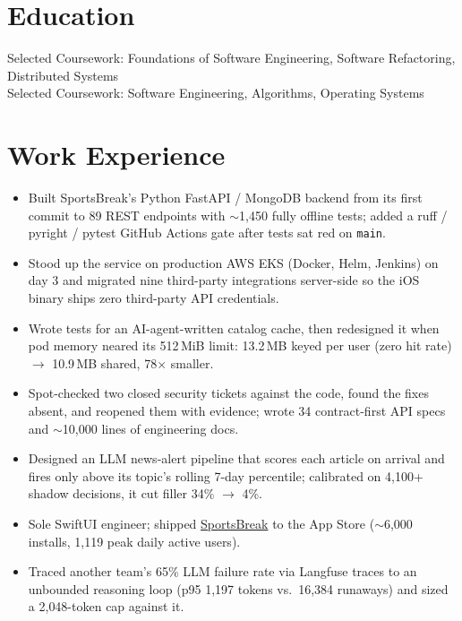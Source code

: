 \documentclass[11pt, letterpaper]{article}
\begin{document}

\section{Education}
Selected Coursework: Foundations of Software Engineering, Software Refactoring, Distributed Systems\\[1pt]
Selected Coursework: Software Engineering, Algorithms, Operating Systems

\section{Work Experience}
\begin{itemize}
  \item Built SportsBreak's Python FastAPI / MongoDB backend from its first commit to 89 REST endpoints with $\sim$1{,}450 fully offline tests; added a ruff / pyright / pytest GitHub Actions gate after tests sat red on \texttt{main}.
  \item Stood up the service on production AWS EKS (Docker, Helm, Jenkins) on day 3 and migrated nine third-party integrations server-side so the iOS binary ships zero third-party API credentials.
  \item Wrote tests for an AI-agent-written catalog cache, then redesigned it when pod memory neared its 512\,MiB limit: 13.2\,MB keyed per user (zero hit rate) $\to$ 10.9\,MB shared, 78$\times$ smaller.
  \item Spot-checked two closed security tickets against the code, found the fixes absent, and reopened them with evidence; wrote 34 contract-first API specs and $\sim$10{,}000 lines of engineering docs.
  \item Designed an LLM news-alert pipeline that scores each article on arrival and fires only above its topic's rolling 7-day percentile; calibrated on 4{,}100+ shadow decisions, it cut filler 34\% $\to$ 4\%.
  \item Sole SwiftUI engineer; shipped \href{https://apps.apple.com/app/id6762649287}{SportsBreak} to the App Store ($\sim$6{,}000 installs, 1{,}119 peak daily active users).
  \item Traced another team's 65\% LLM failure rate via Langfuse traces to an unbounded reasoning loop (p95 1{,}197 tokens vs.\ 16{,}384 runaways) and sized a 2{,}048-token cap against it.
\end{itemize}
\end{document}

